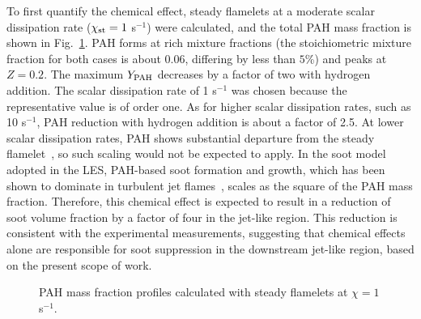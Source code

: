 \documentclass[review,3p,times]{elsarticle}
\begin{document}
To first quantify the chemical effect, steady flamelets at a moderate scalar dissipation rate ($\chi_{\rm st} = 1$ s$^{-1}$) were calculated, and the total PAH mass fraction is shown in Fig.~\ref{fig:flamelet}.  PAH forms at rich mixture fractions (the stoichiometric mixture fraction for both cases is about $0.06$, differing by less than $5$\%) and peaks at $Z = 0.2$.  The maximum $Y_{\rm PAH}$ decreases by a factor of two with hydrogen addition.  \textcolor{Rv1}{The scalar dissipation rate of 1 s$^{-1}$ was chosen because the representative value is of order one.  As for higher scalar dissipation rates, such as 10 s$^{-1}$, PAH reduction with hydrogen addition is about a factor of 2.5.  At lower scalar dissipation rates, PAH shows substantial departure from the steady flamelet~\cite{bisetti12}, so such scaling would not be expected to apply.  }In the soot model adopted in the LES, PAH-based soot formation and growth, which has been shown to dominate in turbulent jet flames~\cite{bisetti12,attili14,attili15,mueller12,mueller13}, scales as the square of the PAH mass fraction.  Therefore, this chemical effect is expected to result in a reduction of soot volume fraction by a factor of four in the jet-like region.  This reduction is consistent with the experimental measurements, \textcolor{Rv1}{suggesting that chemical effects alone are responsible for soot suppression in the downstream jet-like region, based on the present scope of work.}

\begin{figure}[t]
  \centering
  \scriptsize
  \resizebox{0.5\textwidth}{!}{}
  \normalsize
  \vspace{-0.3in}
  \caption{PAH mass fraction profiles calculated with steady flamelets at $\chi = 1$ s$^{-1}$.}
  \label{fig:flamelet}
\end{figure}
\end{document}
